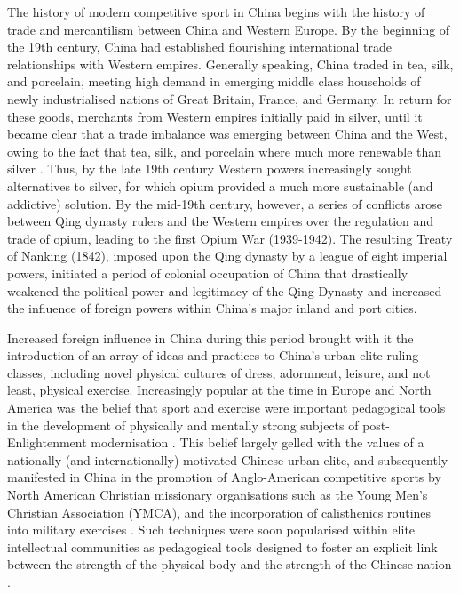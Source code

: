 \begin{CJK}{UTF8}{gbsn}
The history of modern competitive sport in China begins with the history of trade and mercantilism between China and Western Europe.
By the beginning of the 19th century, China had established flourishing international trade relationships with Western empires.  Generally speaking, China traded in tea, silk, and porcelain, meeting high demand in emerging middle class households of newly industrialised nations of Great Britain, France, and Germany.  In return for these goods, merchants from Western empires initially paid in silver, until it became clear that a trade imbalance was emerging between China and the West, owing to the fact that tea, silk, and porcelain where much more renewable than silver \citep{Fay2005}.  Thus, by the late 19th century Western powers increasingly sought alternatives to silver, for which opium provided a much more sustainable (and addictive) solution.  By the mid-19th century, however, a series of conflicts arose between Qing dynasty rulers and the Western empires over the regulation and trade of opium, leading to the first Opium War (1939-1942).  The resulting Treaty of Nanking (1842), imposed upon the Qing dynasty by a league of eight imperial powers, initiated a period of colonial occupation of China that drastically weakened the political power and legitimacy of the Qing Dynasty and increased the influence of foreign powers within China's major inland and port cities.

Increased foreign influence in China during this period brought with it the introduction of an array of ideas and practices to China's urban elite ruling classes, including novel physical cultures of dress, adornment, leisure, and not least, physical exercise.  Increasingly popular at the time in Europe and North America was the belief that sport and exercise were important pedagogical tools in the development of physically and mentally strong subjects of post-Enlightenment modernisation \citep{Elias1986}.  This belief largely gelled with the values of a nationally (and internationally) motivated Chinese urban elite, and subsequently manifested in China in the promotion of Anglo-American competitive sports by North American Christian missionary organisations such as the Young Men’s Christian Association (YMCA), and the incorporation of calisthenics routines into military exercises \citep[240]{Morris2004}.  Such techniques were soon popularised within elite intellectual communities as pedagogical tools designed to foster an explicit link between the strength of the physical body and the strength of the Chinese nation \cites[32]{Morris2004}[49]{Brownell1995}.


\end{CJK}
